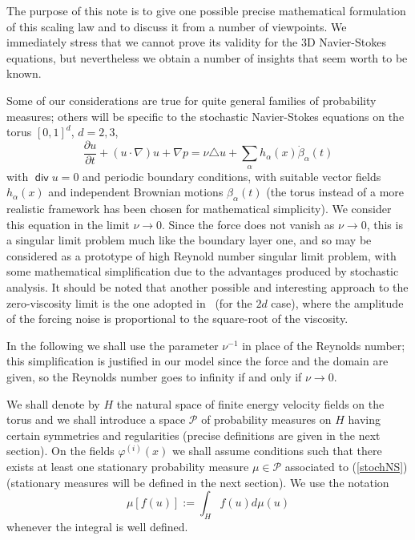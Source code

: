\documentclass[11pt]{preprint}
\DeclareMathOperator{\Div}{\mathsf{div}}
\begin{document}
The purpose of this note is to give one possible precise mathematical
formulation of this scaling law and to discuss it from a number of viewpoints. We
immediately stress that we cannot prove its validity for the 3D Navier-Stokes
equations, but nevertheless we obtain a number of insights that seem worth
to be known.

Some of our considerations are true for quite general families of probability
measures; others will be specific to the stochastic Navier-Stokes equations on
the torus $\left[  0,1\right]  ^{d}$, $d=2,3$,
\begin{equation}
\frac{\partial u}{\partial t}+\left(  u\cdot\nabla\right)  u+\nabla
p=\nu\triangle u+\sum_{\alpha} h_{\alpha}(x) {\dot\beta}_{\alpha}(t)
 \label{stochNS}%
\end{equation}
with $\Div u=0$ and periodic boundary conditions, with suitable vector fields $h_{\alpha}\left(  x\right)  $ and independent Brownian motions $\beta_{\alpha}\left(
t\right)  $ (the torus instead of a more realistic framework has been chosen
for mathematical simplicity). We consider this equation in the limit $\nu\rightarrow
0$. Since the force does not vanish as $\nu\rightarrow0$, this is a singular
limit problem much like the boundary layer one, and so may be considered as a
prototype of high Reynold number singular limit problem, with some
mathematical simplification due to the advantages produced by stochastic analysis. It should be noted that another possible and interesting approach to the zero-viscosity limit is the one adopted in~\cite{Kuksin} (for the $2d$ case), where the amplitude of the forcing noise is proportional to the square-root of the viscosity.

In the following we shall use the parameter $\nu^{-1}$ in place of the
Reynolds number; this simplification is justified in our model since the force
and the domain are given, so the Reynolds number goes to infinity if and only
if $\nu\rightarrow0$.

We shall denote by $H$ the natural space of finite energy velocity fields on
the torus and we shall introduce a space $\mathcal{P}$ of probability measures
on $H$ having certain symmetries and regularities (precise definitions are
given in the next section). On the fields $\varphi^{\left(  i\right)  }\left(
x\right)  $ we shall assume conditions such that there exists at least one
stationary probability measure $\mu\in\mathcal{P}$ associated to
(\ref{stochNS}) (stationary measures will be defined in the next section). We
use the notation
\[
\mu\left[  f\left(  u\right)  \right]  :=\int_{H}f\left(  u\right)
d\mu\left(  u\right)
\]
whenever the integral is well defined.
\end{document}

